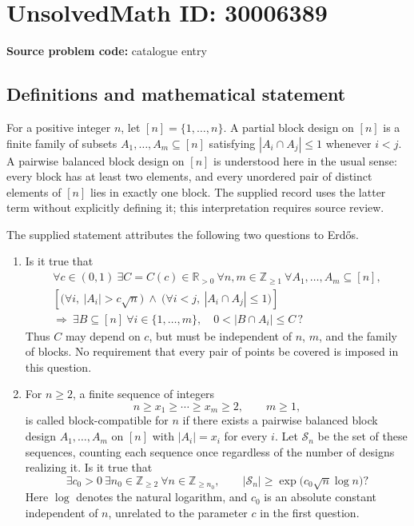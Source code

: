 \documentclass[11pt]{article}
\newcommand{\Z}{\mathbb{Z}}
\newcommand{\R}{\mathbb{R}}
\begin{document}
\section*{UnsolvedMath ID: 30006389}
\textbf{Source problem code:} catalogue entry
\subsection{Definitions and mathematical statement}
For a positive integer \(n\), let \([n]=\{1,\ldots,n\}\). A partial block design on \([n]\) is a finite family of subsets \(A_1,\ldots,A_m\subseteq[n]\) satisfying \(|A_i\cap A_j|\leq1\) whenever \(i<j\). A pairwise balanced block design on \([n]\) is understood here in the usual sense: every block has at least two elements, and every unordered pair of distinct elements of \([n]\) lies in exactly one block. The supplied record uses the latter term without explicitly defining it; this interpretation requires source review.

The supplied statement attributes the following two questions to Erd\H{o}s.
\begin{enumerate}
\item Is it true that
\[
\begin{gathered}
\forall c\in(0,1)\ \exists C=C(c)\in\R_{>0}\ \forall n,m\in\Z_{\geq1}\ 
\forall A_1,\ldots,A_m\subseteq[n],\\
\left[\bigl(\forall i,\ |A_i|>c\sqrt n\bigr)\ \land\ 
\bigl(\forall i<j,\ |A_i\cap A_j|\leq1\bigr)\right]\\
\Longrightarrow\ 
\exists B\subseteq[n]\ \forall i\in\{1,\ldots,m\},\quad
0<|B\cap A_i|\leq C\,?
\end{gathered}
\]
Thus \(C\) may depend on \(c\), but must be independent of \(n\), \(m\), and the family of blocks. No requirement that every pair of points be covered is imposed in this question.
\item For \(n\geq2\), a finite sequence of integers
\[
n\geq x_1\geq\cdots\geq x_m\geq2,\qquad m\geq1,
\]
is called block-compatible for \(n\) if there exists a pairwise balanced block design \(A_1,\ldots,A_m\) on \([n]\) with \(|A_i|=x_i\) for every \(i\). Let \(\mathcal S_n\) be the set of these sequences, counting each sequence once regardless of the number of designs realizing it. Is it true that
\[
\exists c_0>0\ \exists n_0\in\Z_{\geq2}\ \forall n\in\Z_{\geq n_0},\qquad
|\mathcal S_n|\geq\exp\!\bigl(c_0\sqrt n\log n\bigr)?
\]
Here \(\log\) denotes the natural logarithm, and \(c_0\) is an absolute constant independent of \(n\), unrelated to the parameter \(c\) in the first question.
\end{enumerate}
\end{document}
